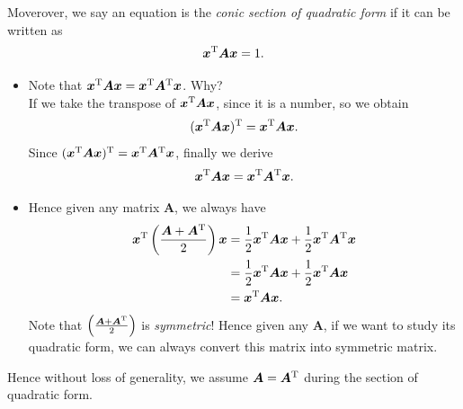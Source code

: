 Moverover, we say an equation is the \emph{conic section of quadratic form} if it can be written as
\[
\bm x^{\mathrm T}\bm A\bm x=1.
\]
\begin{itemize}
\item
Note that $\bm x^{\mathrm T}\bm A\bm x=\bm x^{\mathrm T}\bm A^{\mathrm T}\bm x$. Why?\\ If we take the transpose of $\bm x^{\mathrm T}\bm A\bm x$, since it is a number, so we obtain
\[
(\bm x^{\mathrm T}\bm A\bm x)^{\mathrm T}=\bm x^{\mathrm T}\bm A\bm x.
\]
Since $(\bm x^{\mathrm T}\bm A\bm x)^{\mathrm T}=\bm x^{\mathrm T}\bm A^{\mathrm T}\bm x$, finally we derive 
\[
\bm x^{\mathrm T}\bm A\bm x=\bm x^{\mathrm T}\bm A^{\mathrm T}\bm x.
\]
\item
Hence given any matrix $\bm A$, we always have
\begin{align*}
\bm x^{\mathrm T}\left(\frac{\bm A+\bm A^{\mathrm T}}{2}\right)\bm x&=\frac{1}{2}\bm x^{\mathrm T}\bm A\bm x+\frac{1}{2}\bm x^{\mathrm T}\bm A^{\mathrm T}\bm x\\&=\frac{1}{2}\bm x^{\mathrm T}\bm A\bm x+\frac{1}{2}\bm x^{\mathrm T}\bm A\bm x\\&=\bm x^{\mathrm T}\bm A\bm x.
\end{align*}
Note that $\left(\frac{\bm A+\bm A^{\mathrm T}}{2}\right)$ is \textit{symmetric}! Hence given any $\bm A$, if we want to study its quadratic form, we can always convert this matrix into symmetric matrix.\\
\end{itemize}
Hence without loss of generality, we assume $\bm A=\bm A^{\mathrm T}$ during the section of quadratic form.
